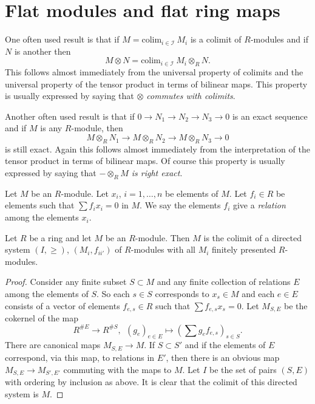 \section{Flat modules and flat ring maps}
\label{section-flat}

\noindent
One often used result is that if $M = \text{colim}_{i\in \mathcal{I}}\ M_i$
is a colimit of $R$-modules and if $N$ is another then
$$
M \otimes N
=
\text{colim}_{i\in \mathcal{I}}\ M_i \otimes_R N.
$$
This follows almost immediately from the universal
property of colimits and the universal property of
the tensor product in terms of bilinear maps.
This property is usually expressed by saying
that {\it $\otimes$ commutes with colimits}.

\medskip\noindent
Another often used result is that if $0\to N_1 \to N_2 \to N_3\to 0$
is an exact sequence and if $M$ is any $R$-module, then
$$
M\otimes_R N_1
\to
M\otimes_R N_2
\to
M\otimes_R N_3
\to
0
$$
is still exact. Again this follows almost immediately from
the interpretation of the tensor product in terms of
bilinear maps. Of course this property is usually expressed
by saying that {\it $-\otimes_R M$ is right exact}.

\medskip\noindent
Let $M$ be an $R$-module. Let $x_i$, $i = 1, \ldots, n$ be elements
of $M$. Let $f_i \in R$ be elements such that $\sum f_i x_i = 0$
in $M$. We say the elements $f_i$ give a {\it relation}
among the elements $x_i$.

\begin{lemma}
\label{lemma-module-colimit-fp}
Let $R$ be a ring and let $M$ be an $R$-module.
Then $M$ is the colimit of a directed system
$(I, \geq)$, $(M_i, f_{ii'})$ of $R$-modules
with all $M_i$ finitely presented $R$-modules.
\end{lemma}

\begin{proof}
Consider any finite subset $S \subset M$ and any finite
collection of relations $E$ among the elements
of $S$. So each $s \in S$ corresponds to $x_s \in M$ and
each $e \in E$ consists of a vector
of elements $f_{e, s} \in R$ such that $\sum f_{e, s} x_s = 0$.
Let $M_{S, E}$ be the cokernel of the map
$$
R^{\# E}
\longrightarrow
R^{\# S}, \ \ 
(g_e)_{e\in E}
\longmapsto
(\sum g_e f_{e, s})_{s\in S}.
$$
There are canonical maps $M_{S, E} \to M$.
If $S \subset S'$ and if the elements of
$E$ correspond, via this map, to relations
in $E'$, then there is an obvious map
$M_{S, E} \to M_{S', E'}$ commuting with the
maps to $M$. Let $I$ be the set of pairs
$(S, E)$ with ordering by inclusion as above.
It is clear that the colimit of this directed system is $M$.
\end{proof}

